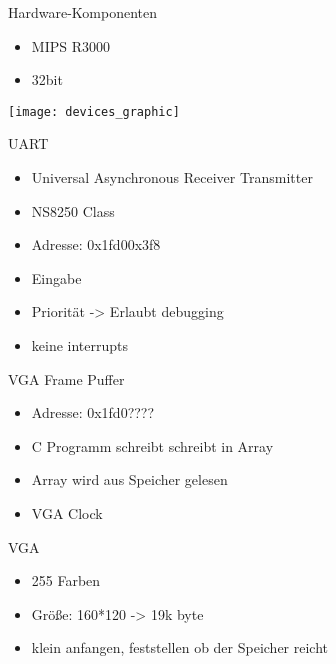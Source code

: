 \begin{frame}{Hardware-Komponenten}

\begin{itemize}
	\item MIPS R3000
	\item 32bit
\end{itemize}

\begin{center}
\texttt{[image: devices\_graphic]} %
\end{center}


\begin{frame}{UART}

\begin{itemize}
	\item Universal Asynchronous Receiver Transmitter
	\item NS8250 Class 
	\item Adresse: 0x1fd00x3f8
	\item Eingabe
	\item Priorität -> Erlaubt debugging
	\item keine interrupts
\end{itemize}
\begin{center}
\end{center}


\end{frame}

\begin{frame}{VGA Frame Puffer}
	\begin{itemize}
		\item Adresse: 0x1fd0????
		\item C Programm schreibt schreibt in Array
		\item Array wird aus Speicher gelesen
		\item VGA Clock
	\end{itemize}
\end{frame}

\begin{frame}{VGA}
	\begin{itemize}		
		\item 255 Farben
		\item Größe: 160*120 -> 19k byte
		\item klein anfangen, feststellen ob der Speicher reicht
	\end{itemize}
\end{frame}


\end{frame}
